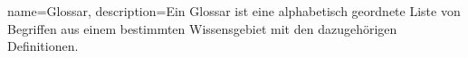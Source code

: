 
{
	name=Glossar,
	description={Ein Glossar ist eine alphabetisch geordnete Liste von Begriffen aus einem bestimmten Wissensgebiet mit den dazugehörigen Definitionen.}
}
